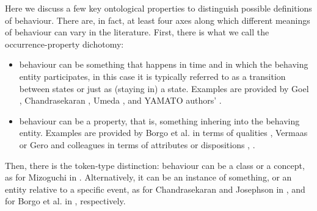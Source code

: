\documentclass[sw]{iosart2x}
\newcommand{\YAMATO}{\textsc{YAMATO}\xspace}
\newcommand{\stateVarCond}[1]{%
  \ifthenelse{\equal{#1}{fullSingular}}{system condition}{%
    \ifthenelse{\equal{#1}{shortSingular}}{condition}{%
      \ifthenelse{\equal{#1}{fullPlural}}{system conditions}{%
        \ifthenelse{\equal{#1}{shortPlural}}{conditions}{%
          ERROR!%
        }%
      }%
    }%
  }%
}
\newcommand{\TODO}[1]{{%
}}
\newcommand{\myComment}[1]{{\unskip \ignorespaces}}
\begin{document}

Here we discuss a few key ontological properties to distinguish possible definitions of behaviour.
There are, in fact, at least four %
axes along which different meanings of behaviour can vary in the literature.
First, there is what we call the occurrence-property dichotomy:
\begin{itemize}
  \item behaviour can be something that happens in time \myComment{(occurs)} and in which the behaving entity participates, 
  in this case it is typically referred to as a transition between states or just as (staying in) a state. 
  Examples are provided by Goel \cite{goelStructureBehaviorFunction2009}, Chandrasekaran \cite{chandrasekaranFunctionDeviceRepresentation2000}, Umeda \cite{umedaFunctionBehaviourStructure1990}, and \YAMATO authors' \cite{mizoguchiFunctionalOntologyArtifacts2009}.
  \item behaviour can \myComment{also} be a property, that is, something inhering into the behaving entity. 
  \myComment{In this case some authors speak of} Examples are provided by Borgo et al. in terms of qualities \cite{borgoFormalOntologicalPerspective2009}, Vermaas or Gero and colleagues in terms of attributes or dispositions \cite{vermaasConceptualFrameworkJohn2007}, \cite{geroCategorisingTechnologicalKnowledge2002}.
\end{itemize} 

Then, there is the token-type distinction: behaviour can be a class or a concept, as for  Mizoguchi in \cite{mizoguchiFunctionalOntologyArtifacts2009}. Alternatively, it can be an instance of something, or an entity relative to a specific event, as for Chandrasekaran and Josephson in \cite{chandrasekaranFunctionDeviceRepresentation2000}, and for Borgo et al. in \cite{borgoFormalOntologicalPerspective2009}, respectively. 
\end{document}
